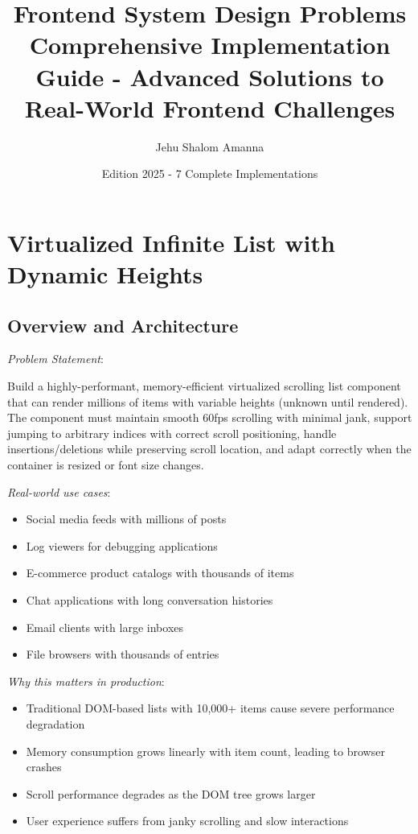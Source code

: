\documentclass[11pt]{article}
\author{Jehu Shalom Amanna}
\date{Edition 2025 - 7 Complete Implementations}
\title{Frontend System Design Problems\\\medskip
\large Comprehensive Implementation Guide - Advanced Solutions to Real-World Frontend Challenges}
\begin{document}
\maketitle
\tableofcontents

\section{Virtualized Infinite List with Dynamic Heights}
\label{sec:orgd1e1cf4}

\subsection{Overview and Architecture}
\label{sec:orgf56faeb}

\emph{Problem Statement}: 

Build a highly-performant, memory-efficient virtualized scrolling list component that can render millions of items with variable heights (unknown until rendered). The component must maintain smooth 60fps scrolling with minimal jank, support jumping to arbitrary indices with correct scroll positioning, handle insertions/deletions while preserving scroll location, and adapt correctly when the container is resized or font size changes.

\emph{Real-world use cases}:

\begin{itemize}
\item Social media feeds with millions of posts
\item Log viewers for debugging applications
\item E-commerce product catalogs with thousands of items
\item Chat applications with long conversation histories
\item Email clients with large inboxes
\item File browsers with thousands of entries
\end{itemize}

\emph{Why this matters in production}:

\begin{itemize}
\item Traditional DOM-based lists with 10,000+ items cause severe performance degradation
\item Memory consumption grows linearly with item count, leading to browser crashes
\item Scroll performance degrades as the DOM tree grows larger
\item User experience suffers from janky scrolling and slow interactions
\end{itemize}
\end{document}
